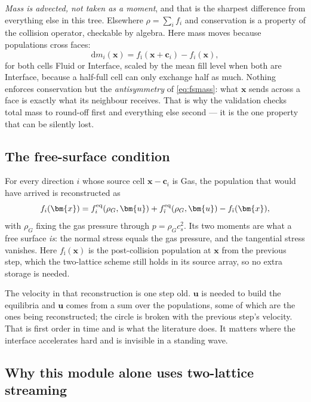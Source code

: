 \documentclass[11pt,a4paper]{article}
\newcommand{\cs}{c_s}
\newcommand{\ci}{\bm{c}_i}
\newcommand{\uu}{\bm{u}}
\newcommand{\xx}{\bm{x}}
\begin{document}
\emph{Mass is advected, not taken as a moment}, and that is the sharpest
difference from everything else in this tree. Elsewhere $\rho = \sum_i f_i$ and
conservation is a property of the collision operator, checkable by algebra. Here
mass moves because populations cross faces:
\begin{equation}
  \mathrm{d}m_i(\xx) = f_{\bar\imath}(\xx + \ci) - f_i(\xx),
  \label{eq:fsmass}
\end{equation}
for both cells Fluid or Interface, scaled by the mean fill level when both are
Interface, because a half-full cell can only exchange half as much. Nothing
enforces conservation but the \emph{antisymmetry} of \eqref{eq:fsmass}: what
$\xx$ sends across a face is exactly what its neighbour receives. That is why
the validation checks total mass to round-off first and everything else second
--- it is the one property that can be silently lost.

\subsection{The free-surface condition}

For every direction $i$ whose source cell $\xx - \ci$ is Gas, the population
that would have arrived is reconstructed as
\begin{equation}
  f_i(\xx) = f_i^{\rm eq}(\rho_G, \uu) + f_{\bar\imath}^{\rm eq}(\rho_G, \uu)
             - f_{\bar\imath}(\xx),
\end{equation}
with $\rho_G$ fixing the gas pressure through $p = \rho_G \cs^2$. Its two
moments are what a free surface \emph{is}: the normal stress equals the gas
pressure, and the tangential stress vanishes. Here $f_{\bar\imath}(\xx)$ is the
post-collision population at $\xx$ from the previous step, which the two-lattice
scheme still holds in its source array, so no extra storage is needed.

The velocity in that reconstruction is one step old. $\uu$ is needed to build
the equilibria and $\uu$ comes from a sum over the populations, some of which
are the ones being reconstructed; the circle is broken with the previous step's
velocity. That is first order in time and is what the literature does. It
matters where the interface accelerates hard and is invisible in a standing
wave.

\subsection{Why this module alone uses two-lattice streaming}
\label{sec:fstwolattice}
\end{document}
